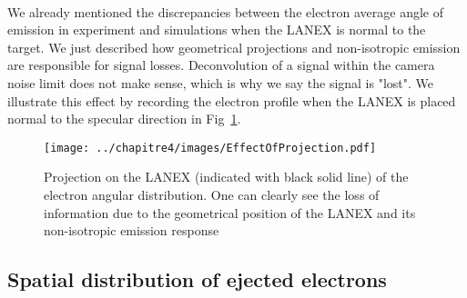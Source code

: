 
\\

\noindent We already mentioned the discrepancies between the electron average angle of emission in experiment and simulations when the LANEX is normal to the target. We just described how geometrical projections and non-isotropic emission are responsible for signal losses. Deconvolution of a signal within the camera noise limit does not make sense, which is why we say the signal is "lost". We illustrate this effect by recording the electron profile when the LANEX is placed normal to the specular direction in Fig~\ref{fig:EffectOfProjection}.


\begin{figure}[H]
\centering
\texttt{[image: ../chapitre4/images/EffectOfProjection.pdf]}\\
\caption{\label{fig:EffectOfProjection} Projection on the LANEX (indicated with black solid line) of the electron angular distribution. One can clearly see the loss of information due to the geometrical position of the LANEX and its non-isotropic emission response}
\end{figure}

%
%

\newpage
\subsection{Spatial distribution of ejected electrons}\label{subsub:Spatial distribution of ejected electrons}

